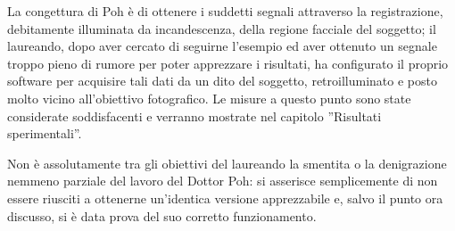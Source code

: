 La congettura di Poh è di ottenere i suddetti segnali attraverso la registrazione, debitamente illuminata da incandescenza, della regione facciale del soggetto; il laureando, dopo aver cercato di seguirne l'esempio ed aver ottenuto un segnale troppo pieno di rumore per poter apprezzare i risultati, ha configurato il proprio software per acquisire tali dati da un dito del soggetto, retroilluminato e posto molto vicino all'obiettivo fotografico. Le misure a questo punto sono state considerate soddisfacenti e verranno mostrate nel capitolo ''Risultati sperimentali''.

Non è assolutamente tra gli obiettivi del laureando la smentita o la denigrazione nemmeno parziale del lavoro del Dottor Poh: si asserisce semplicemente di non essere riusciti a ottenerne un'identica versione apprezzabile e, salvo il punto ora discusso, si è data prova del suo corretto funzionamento.

